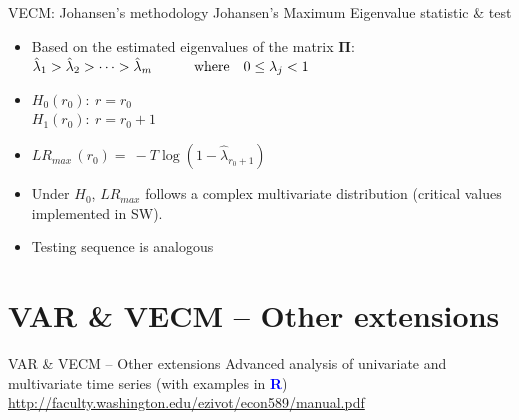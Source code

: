 \documentclass[usenames,dvipsnames]{beamer}
\begin{document}
\begin{frame}{VECM: Johansen’s methodology}
Johansen's Maximum Eigenvalue statistic \& test\\
\bigskip
\begin{itemize}
    \item Based on the estimated eigenvalues of the matrix $\bm{\Pi}$:\\
    $\hat{\lambda}_1 > \hat{\lambda}_2 > \dots > \hat{\lambda}_m \qquad \textnormal{~~~where~~~}0 \leq \lambda_j < 1$
    \medskip
    \item $H_0(r_0):~r=r_0$ \\$H_1(r_0):~r = r_0+1$
    \medskip
    \item $\textit{LR}_{\textit{max}}\, (r_0)=~ - T \log(1-\hat{\lambda}_{r_0+1}) $\\
    \medskip
    \item Under $H_0$, $\textit{LR}_{\textit{max}}$ follows a complex multivariate distribution (critical values implemented in SW).
    \medskip
    \item Testing sequence is analogous
\end{itemize}
\end{frame}
\section{VAR \& VECM – Other extensions}
\begin{frame}{VAR \& VECM – Other extensions}
Advanced analysis of univariate and multivariate time series (with examples in 
\textcolor{Blue}{\textbf{R}})\\
\bigskip
\textcolor{Blue}{
\tiny
\url{http://faculty.washington.edu/ezivot/econ589/manual.pdf}
}
\end{frame}
\end{document}
